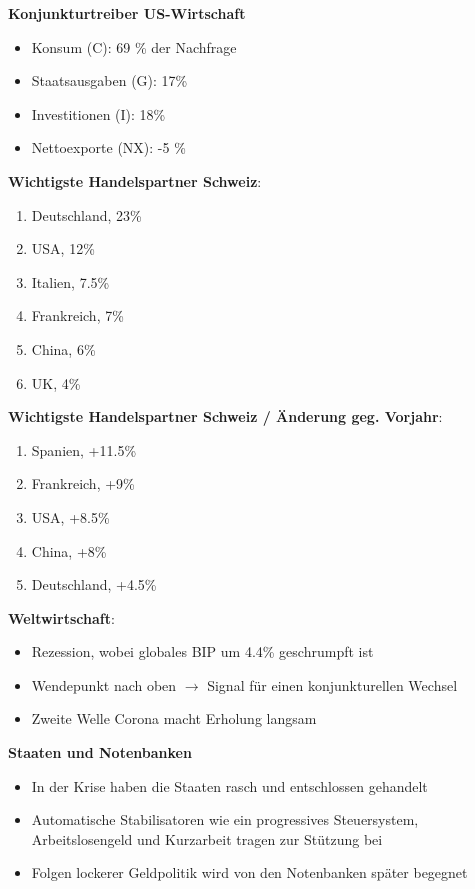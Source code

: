 \documentclass[9pt, landscape, fleqn]{scrartcl}
\begin{document}
\begin{multicols*}{3}
\textbf{Konjunkturtreiber US-Wirtschaft}

\begin{itemize}
    \item Konsum (C): 69 \% der Nachfrage
    \item Staatsausgaben (G): 17\%
    \item Investitionen (I): 18\% 
    \item Nettoexporte (NX): -5 \%
\end{itemize}

\textbf{Wichtigste Handelspartner Schweiz}: 

\begin{enumerate}
    \item Deutschland, 23\%
    \item USA, 12\% 
    \item Italien, 7.5\% 
    \item Frankreich, 7\% 
    \item China, 6\%
    \item UK, 4\%
\end{enumerate}

\textbf{Wichtigste Handelspartner Schweiz / Änderung geg. Vorjahr}:

\begin{enumerate}
    \item Spanien, +11.5\%
    \item Frankreich, +9\% 
    \item USA, +8.5\%
    \item China, +8\%
    \item Deutschland, +4.5\% 
\end{enumerate} 
\newpage
\textbf{Weltwirtschaft}:

\begin{itemize}
    \item Rezession, wobei globales BIP um 4.4\% geschrumpft ist 
    \item Wendepunkt nach oben $\rightarrow$ Signal für einen konjunkturellen Wechsel 
    \item Zweite Welle Corona macht Erholung langsam
\end{itemize}

\textbf{Staaten und Notenbanken}

\begin{itemize}
    \item In der Krise haben die Staaten rasch und entschlossen gehandelt
    \item Automatische Stabilisatoren wie ein progressives Steuersystem, Arbeitslosengeld und Kurzarbeit tragen zur Stützung bei
    \item Folgen lockerer Geldpolitik wird von den Notenbanken später begegnet 
\end{itemize}


\end{multicols*}
\end{document}
